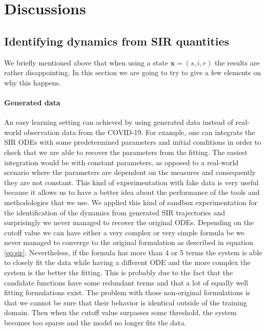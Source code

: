 \documentclass[12pt, letterpaper]{article}
\begin{document}
\section{Discussions}\label{sec:discussions}

\subsection{Identifying dynamics from SIR quantities}\label{sec:sirfail}

We briefly mentioned above that when using a state $\mathbf{x} = (s, i, r)$ the results are rather disappointing. In this section we are going to try to give a few elements on why this happens. 

\paragraph{Generated data}

An easy learning setting can achieved by using generated data instead of real-world observation data from the COVID-19. 
For example, one can integrate the SIR ODEs with some predetermined parameters and initial conditions in order to check that we are able to recover the parameters from the fitting.
The easiest integration would be with constant parameters, as opposed to a real-world scenario where the parameters are dependent on the measures and consequently they are not constant.
This kind of experimentation with fake data is very useful because it allows us to have a better idea about the performance of the tools and methodologies that we use.
We applied this kind of sandbox experimentation for the identification of the dynamics from generated SIR trajectories and surprisingly we never managed to recover the original ODEs.
Depending on the cutoff value we can have either a very complex or very simple formula be we never managed to converge to the original formulation as described in equation \ref{eq:sir}. 
Nevertheless, if the formula has more than 4 or 5 terms the system is able to closely fit the data while having a different ODE and the more complex the system is the better the fitting. 
This is probably due to the fact that the candidate functions have some redundant terms and that a lot of equally well fitting formulations exist.
The problem with those non-original formulations is that we cannot be sure that their behavior is identical outside of the training domain.
Then when the cutoff value surpasses some threshold, the system becomes too sparse and the model no longer fits the data.
\end{document}
